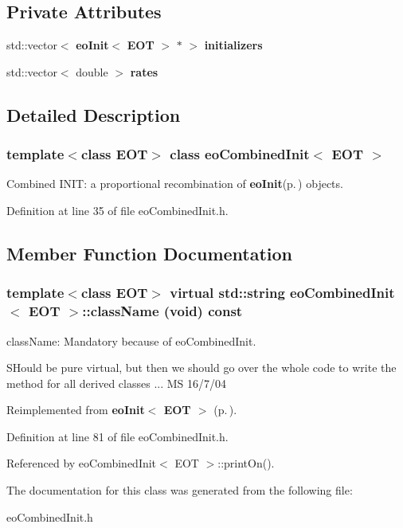 \subsection*{Private Attributes}
\begin{CompactItemize}
\item 
std::vector$<$ {\bf eo\-Init}$<$ {\bf EOT} $>$ $\ast$ $>$ {\bf initializers}\label{classeo_combined_init_r0}

\item 
std::vector$<$ double $>$ {\bf rates}\label{classeo_combined_init_r1}

\end{CompactItemize}


\subsection{Detailed Description}
\subsubsection*{template$<$class EOT$>$ class eo\-Combined\-Init$<$ EOT $>$}

Combined INIT: a proportional recombination of {\bf eo\-Init}{\rm (p.\,\pageref{classeo_init})} objects. 



Definition at line 35 of file eo\-Combined\-Init.h.

\subsection{Member Function Documentation}
\subsubsection{\setlength{\rightskip}{0pt plus 5cm}template$<$class EOT$>$ virtual std::string {\bf eo\-Combined\-Init}$<$ {\bf EOT} $>$::class\-Name (void) const\hspace{0.3cm}{\tt  [inline, virtual]}}\label{classeo_combined_init_a4}


class\-Name: Mandatory because of eo\-Combined\-Init. 

SHould be pure virtual, but then we should go over the whole code to write the method for all derived classes ... MS 16/7/04 

Reimplemented from {\bf eo\-Init$<$ EOT $>$} {\rm (p.\,\pageref{classeo_init_a0})}.

Definition at line 81 of file eo\-Combined\-Init.h.

Referenced by eo\-Combined\-Init$<$ EOT $>$::print\-On().

The documentation for this class was generated from the following file:\begin{CompactItemize}
\item 
eo\-Combined\-Init.h\end{CompactItemize}
